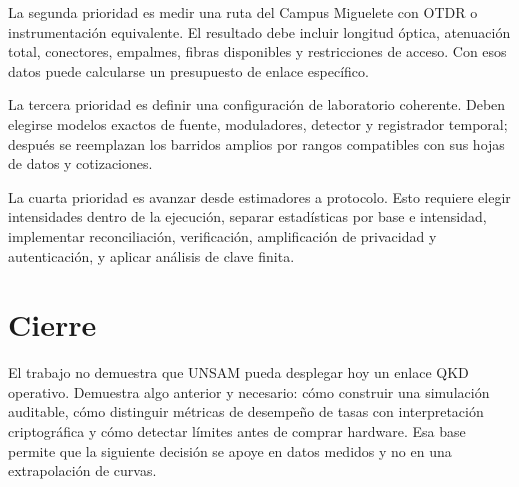 La segunda prioridad es medir una ruta del Campus Miguelete con OTDR o instrumentación equivalente. El resultado debe incluir longitud óptica, atenuación total, conectores, empalmes, fibras disponibles y restricciones de acceso. Con esos datos puede calcularse un presupuesto de enlace específico.

La tercera prioridad es definir una configuración de laboratorio coherente. Deben elegirse modelos exactos de fuente, moduladores, detector y registrador temporal; después se reemplazan los barridos amplios por rangos compatibles con sus hojas de datos y cotizaciones.

La cuarta prioridad es avanzar desde estimadores a protocolo. Esto requiere elegir intensidades dentro de la ejecución, separar estadísticas por base e intensidad, implementar reconciliación, verificación, amplificación de privacidad y autenticación, y aplicar análisis de clave finita.

\section{Cierre}

El trabajo no demuestra que UNSAM pueda desplegar hoy un enlace QKD operativo. Demuestra algo anterior y necesario: cómo construir una simulación auditable, cómo distinguir métricas de desempeño de tasas con interpretación criptográfica y cómo detectar límites antes de comprar hardware. Esa base permite que la siguiente decisión se apoye en datos medidos y no en una extrapolación de curvas.
